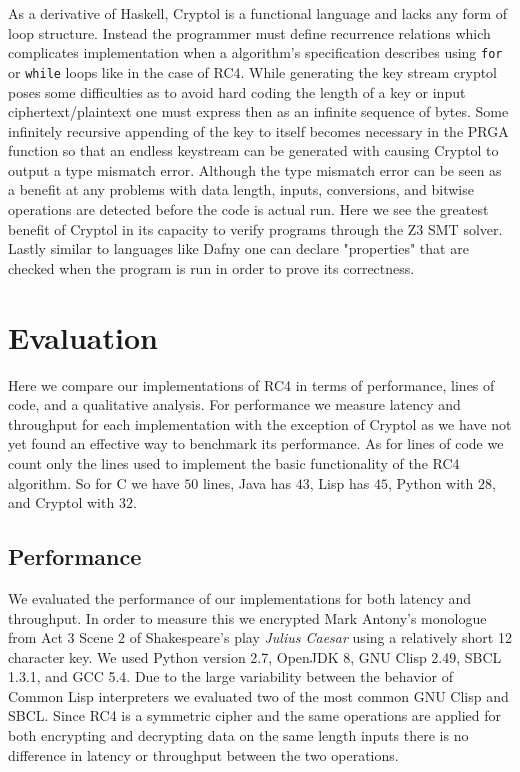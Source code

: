 As a derivative of Haskell, Cryptol is a functional language and lacks any form of loop structure. Instead the 
programmer must define recurrence relations which complicates implementation when a algorithm's specification describes using \texttt{for} or \texttt{while} loops like in the 
case of RC4. While generating the key stream cryptol poses some difficulties as to avoid hard coding the length of a key or input ciphertext/plaintext one must express then as 
an infinite sequence of bytes. Some infinitely recursive appending of the key to itself becomes necessary in the PRGA function so that an endless keystream can be generated with 
causing Cryptol to output a type mismatch error. Although the type mismatch error can be seen as a benefit at any problems with data length, inputs, conversions, and bitwise operations 
are detected before the code is actual run. Here we see the greatest benefit of Cryptol in its capacity to verify programs through the Z3 SMT solver. Lastly similar to languages 
like Dafny one can declare "properties" that are checked when the program is run in order to prove its correctness.

\section{Evaluation}
Here we compare our implementations of RC4 in terms of performance, lines of code, and a qualitative analysis. For performance we measure latency and throughput for 
each implementation with the exception of Cryptol as we have not yet found an effective way to benchmark its performance. As for lines of code we count only the lines used to implement the basic functionality of the RC4 algorithm. So for C we have $50$ lines, Java has $43$, Lisp has $45$, Python with $28$, and Cryptol with $32$.

\subsection{Performance}

We evaluated the performance of our implementations for both latency and throughput. In order to measure this we encrypted Mark Antony's 
monologue from Act $3$ Scene $2$ of Shakespeare's play \emph{Julius Caesar}\cite{JuliusCaesar} using a relatively short 12 character key. We used Python version 2.7, OpenJDK 8, GNU Clisp 2.49, SBCL 1.3.1, and GCC 5.4. Due to the large variability between the behavior of Common Lisp interpreters we evaluated 
two of the most common GNU Clisp and SBCL. Since RC4 is a symmetric cipher and the same operations are applied for both encrypting and decrypting data on the same length inputs there is no difference in
latency or throughput between the two operations.

